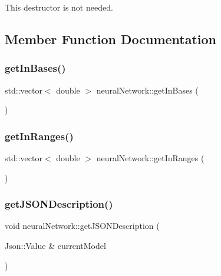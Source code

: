 This destructor is not needed. 

\subsection{Member Function Documentation}
\mbox{\label{classneural_network_af3fdc1c2bdf4794680ccc4cd845fb47e}} 
\subsubsection{\texorpdfstring{get\+In\+Bases()}{getInBases()}}
{\footnotesize\ttfamily std\+::vector$<$ double $>$ neural\+Network\+::get\+In\+Bases (\begin{DoxyParamCaption}{ }\end{DoxyParamCaption})}

\mbox{\label{classneural_network_a876638749a0c7027e82da294947f1840}} 
\subsubsection{\texorpdfstring{get\+In\+Ranges()}{getInRanges()}}
{\footnotesize\ttfamily std\+::vector$<$ double $>$ neural\+Network\+::get\+In\+Ranges (\begin{DoxyParamCaption}{ }\end{DoxyParamCaption})}

\mbox{\label{classneural_network_a83f5c57ed3f555cd534a6f4ea425dfb7}} 
\subsubsection{\texorpdfstring{get\+J\+S\+O\+N\+Description()}{getJSONDescription()}}
{\footnotesize\ttfamily void neural\+Network\+::get\+J\+S\+O\+N\+Description (\begin{DoxyParamCaption}\item[{Json\+::\+Value \&}]{current\+Model }\end{DoxyParamCaption})\hspace{0.3cm}{\ttfamily [virtual]}}



